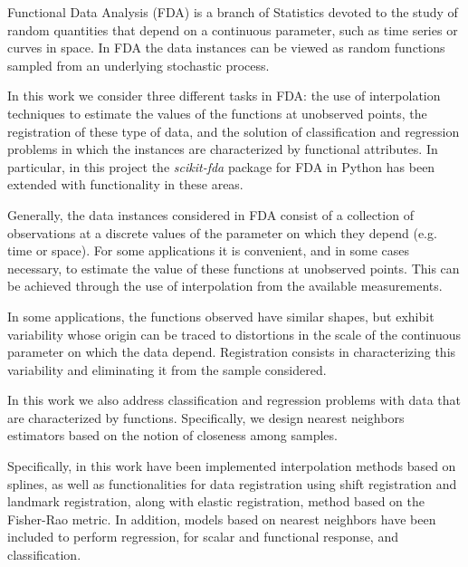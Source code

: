 Functional Data Analysis (FDA) is a branch of Statistics devoted
to the study of random quantities that depend on a continuous parameter,
such as time series or curves in space.
In FDA the data instances can be viewed as random functions
sampled from an underlying stochastic process.

In this work we consider three different tasks in FDA:
the use of interpolation techniques to estimate the values
of the functions at unobserved points,
the registration of these type of data,
and the solution of classification and regression problems in which
the instances are characterized by functional attributes.
In particular, in this project the \textit{scikit-fda} package
for FDA in Python has been extended
with functionality in these areas.

Generally, the data instances considered in FDA consist of a
collection of observations at a discrete values of the parameter
on which they depend (e.g. time or space).
For some applications it is convenient, and in some cases
necessary, to estimate the value of these functions
at unobserved points.
This can be achieved through the use of interpolation
from the available measurements.

In some applications, the functions observed
have similar shapes, but exhibit variability whose
origin can be traced to distortions in the scale
of the continuous parameter on which the data depend.
Registration consists in characterizing
this variability and eliminating it from the sample considered.

In this work we also address classification and regression problems
with data that are characterized by functions.
Specifically, we design nearest neighbors estimators
based on the notion of closeness among samples.

Specifically, in this work have been implemented interpolation methods based on
splines, as well as functionalities for data registration using shift
registration and landmark registration, along with elastic registration,
method based on the Fisher-Rao metric. In addition, models based on nearest
neighbors have been included to perform regression, for scalar and functional
response, and classification.
